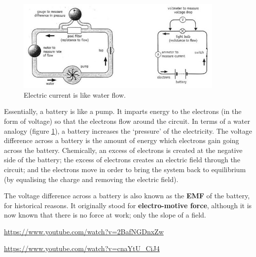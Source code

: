 \documentclass[a4paper]{amsbook}
\newcommand\capcite[1]{}
\begin{document}
\begin{figure}
  \centering
  \includegraphics[width=0.9\textwidth]{wateranalogy}
  \caption{Electric current is like water flow. \capcite{http://www.education.vic.gov.au/PublishingImages/school/teachers/teachingresources/discipline/science/continuum/elecpumpc.jpg}\label{fig:water}}
\end{figure}
Essentially, a battery is like a pump. It imparts energy to the electrons (in the form of voltage) so that the electrons flow around the circuit.
In terms of a water analogy (figure \ref{fig:water}), a battery increases the `pressure' of the electricity. The voltage difference across a
battery is the amount of energy which electrons gain going across the battery. Chemically, an excess of electrons is created at the negative
side of the battery; the excess of electrons creates an electric field through the circuit; and the electrons move in order to bring the system
back to equilibrium (by equalising the charge and removing the electric field).

The voltage difference across a battery is also known as the \textbf{EMF} of the battery, for historical reasons. It originally
stood for \textbf{electro-motive force}, although it is now known that there is no force at work; only the slope of a field.

\begin{center}
\begin{tcolorbox}[width=0.8\textwidth,colback={red},title={\textbf{Go and watch...}},colbacktitle=yellow,coltitle=blue]
  \textcolor{white}{\url{https://www.youtube.com/watch?v=2BafNGDnxZw}}
\end{tcolorbox}
\end{center}

\begin{center}
\begin{tcolorbox}[width=0.8\textwidth,colback={red},title={\textbf{Go and watch...}},colbacktitle=yellow,coltitle=blue]
  \textcolor{white}{\url{https://www.youtube.com/watch?v=cnaYtU_CiJ4}}
\end{tcolorbox}
\end{center}
\end{document}
